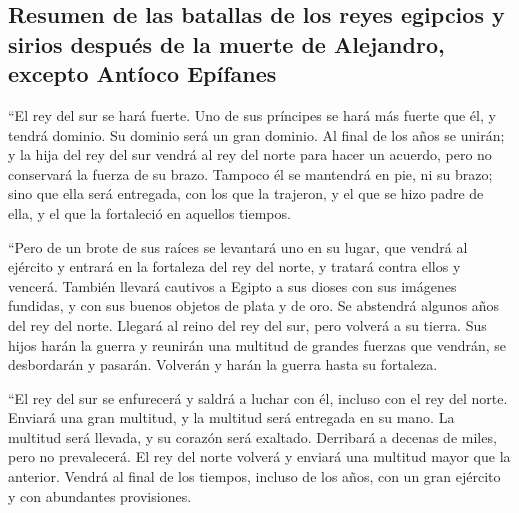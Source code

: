 \hypertarget{resumen-de-las-batallas-de-los-reyes-egipcios-y-sirios-despuuxe9s-de-la-muerte-de-alejandro-excepto-antuxedoco-epuxedfanes}{%
\subsection{Resumen de las batallas de los reyes egipcios y sirios
después de la muerte de Alejandro, excepto Antíoco
Epífanes}\label{resumen-de-las-batallas-de-los-reyes-egipcios-y-sirios-despuuxe9s-de-la-muerte-de-alejandro-excepto-antuxedoco-epuxedfanes}}

 ``El rey del sur se hará fuerte. Uno de sus príncipes se
hará más fuerte que él, y tendrá dominio. Su dominio será un gran
dominio.  Al final de los años se unirán; y la hija del
rey del sur vendrá al rey del norte para hacer un acuerdo, pero no
conservará la fuerza de su brazo. Tampoco él se mantendrá en pie, ni su
brazo; sino que ella será entregada, con los que la trajeron, y el que
se hizo padre de ella, y el que la fortaleció en aquellos tiempos.

 ``Pero de un brote de sus raíces se levantará uno en su
lugar, que vendrá al ejército y entrará en la fortaleza del rey del
norte, y tratará contra ellos y vencerá.  También llevará
cautivos a Egipto a sus dioses con sus imágenes fundidas, y con sus
buenos objetos de plata y de oro. Se abstendrá algunos años del rey del
norte.  Llegará al reino del rey del sur, pero volverá a
su tierra.  Sus hijos harán la guerra y reunirán una
multitud de grandes fuerzas que vendrán, se desbordarán y pasarán.
Volverán y harán la guerra hasta su fortaleza.

 ``El rey del sur se enfurecerá y saldrá a luchar con él,
incluso con el rey del norte. Enviará una gran multitud, y la multitud
será entregada en su mano.  La multitud será llevada, y
su corazón será exaltado. Derribará a decenas de miles, pero no
prevalecerá.  El rey del norte volverá y enviará una
multitud mayor que la anterior. Vendrá al final de los tiempos, incluso
de los años, con un gran ejército y con abundantes provisiones.


